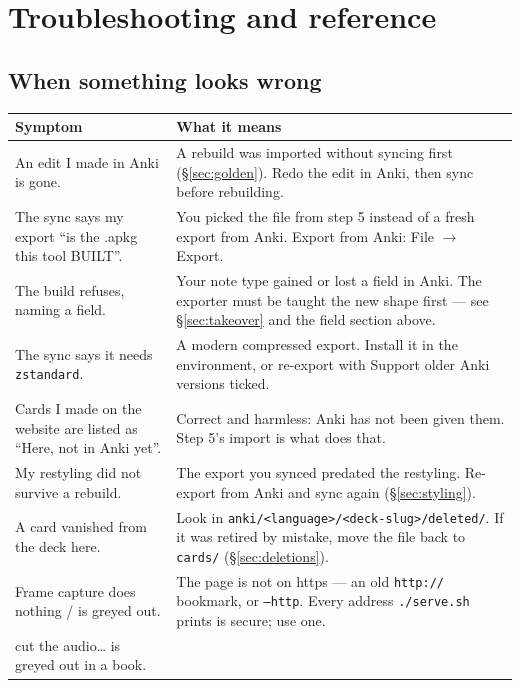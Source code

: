 \documentclass[11pt,oneside]{report}
\newcommand{\file}[1]{\texttt{#1}}
\newcommand{\menu}[1]{\textsf{#1}}
\begin{document}
\chapter{Troubleshooting and reference}

\section{When something looks wrong}

\begin{center}
\begin{longtable}{@{}p{}p{}@{}}
\toprule
\textsf{Symptom} & \textsf{What it means} \\
\midrule
An edit I made in Anki is gone. &
  A rebuild was imported without syncing first (\S\ref{sec:golden}). Redo the
  edit in Anki, then sync before rebuilding. \\
\addlinespace
The sync says my export ``is the .apkg this tool BUILT''. &
  You picked the file from step 5 instead of a fresh export from Anki.
  Export from Anki: \menu{File $\rightarrow$ Export}. \\
\addlinespace
The build refuses, naming a field. &
  Your note type gained or lost a field in Anki. The exporter must be
  taught the new shape first --- see \S\ref{sec:takeover} and the field
  section above. \\
\addlinespace
The sync says it needs \texttt{zstandard}. &
  A modern compressed export. Install it in the environment, or re-export
  with \menu{Support older Anki versions} ticked. \\
\addlinespace
Cards I made on the website are listed as ``Here, not in Anki yet''. &
  Correct and harmless: Anki has not been given them. Step 5's import is
  what does that. \\
\addlinespace
My restyling did not survive a rebuild. &
  The export you synced predated the restyling. Re-export from Anki and
  sync again (\S\ref{sec:styling}). \\
\addlinespace
A card vanished from the deck here. &
  Look in \file{anki/<language>/<deck-slug>/deleted/}. If it was retired by
  mistake, move the file back to \file{cards/} (\S\ref{sec:deletions}). \\
\addlinespace
Frame capture does nothing / is greyed out. &
  The page is not on https --- an old \texttt{http://} bookmark, or
  \texttt{--http}. Every address \file{./serve.sh} prints is secure; use one. \\
\addlinespace
\menu{cut the audio\ldots} is greyed out in a book. &

\end{longtable}
\end{center}
\end{document}
